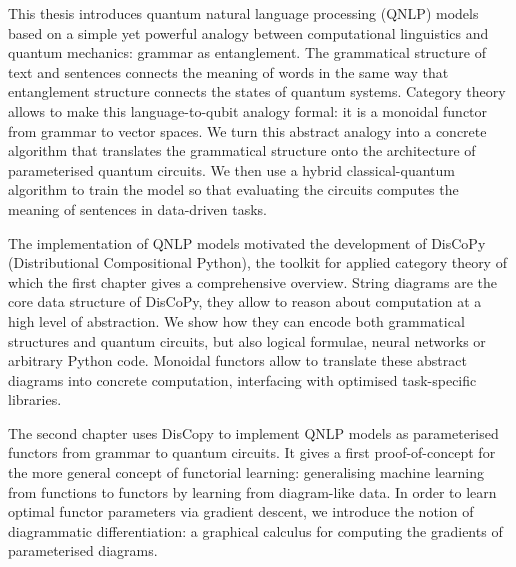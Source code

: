 This thesis introduces quantum natural language processing (QNLP) models based on a simple yet powerful analogy between computational linguistics and quantum mechanics: grammar as entanglement.
The grammatical structure of text and sentences connects the meaning of words in the same way that entanglement structure connects the states of quantum systems.
Category theory allows to make this language-to-qubit analogy formal: it is a monoidal functor from grammar to vector spaces.
We turn this abstract analogy into a concrete algorithm that translates the grammatical structure onto the architecture of parameterised quantum circuits.
We then use a hybrid classical-quantum algorithm to train the model so that evaluating the circuits computes the meaning of sentences in data-driven tasks.

The implementation of QNLP models motivated the development of DisCoPy (Distributional Compositional Python), the toolkit for applied category theory of which the first chapter gives a comprehensive overview.
String diagrams are the core data structure of DisCoPy, they allow to reason about computation at a high level of abstraction.
We show how they can encode both grammatical structures and quantum circuits, but also logical formulae, neural networks or arbitrary Python code.
Monoidal functors allow to translate these abstract diagrams into concrete computation, interfacing with optimised task-specific libraries.

The second chapter uses DisCopy to implement QNLP models as parameterised functors from grammar to quantum circuits.
It gives a first proof-of-concept for the more general concept of functorial learning: generalising machine learning from functions to functors by learning from diagram-like data.
In order to learn optimal functor parameters via gradient descent, we introduce the notion of diagrammatic differentiation: a graphical calculus for computing the gradients of parameterised diagrams.
